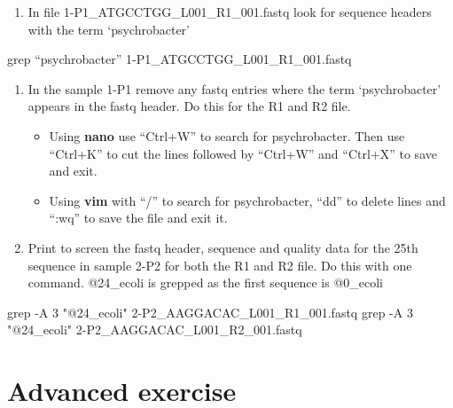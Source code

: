 \documentclass[
  letterpaper,
  DIV=11,
  numbers=noendperiod]{scrreprt}
\newenvironment{Shaded}{\begin{snugshade}}{\end{snugshade}}
\newcommand{\AttributeTok}[1]{\textcolor[rgb]{0.40,0.45,0.13}{#1}}
\newcommand{\FunctionTok}[1]{\textcolor[rgb]{0.28,0.35,0.67}{#1}}
\newcommand{\NormalTok}[1]{\textcolor[rgb]{0.00,0.23,0.31}{#1}}
\newcommand{\StringTok}[1]{\textcolor[rgb]{0.13,0.47,0.30}{#1}}
\providecommand{\tightlist}{%
  \setlength{\itemsep}{0pt}\setlength{\parskip}{0pt}}
\begin{document}
\begin{enumerate}
\def\labelenumi{\arabic{enumi}.}
\setcounter{enumi}{8}
\tightlist
\item
  In file 1-P1\_ATGCCTGG\_L001\_R1\_001.fastq look for sequence headers
  with the term `psychrobacter'
\end{enumerate}

\begin{Shaded}
\begin{Highlighting}[]
\FunctionTok{grep}\NormalTok{ “psychrobacter” 1{-}P1\_ATGCCTGG\_L001\_R1\_001.fastq}
\end{Highlighting}
\end{Shaded}

\begin{enumerate}
\def\labelenumi{\arabic{enumi}.}
\setcounter{enumi}{9}
\tightlist
\item
  In the sample 1-P1 remove any fastq entries where the term
  `psychrobacter' appears in the fastq header. Do this for the R1 and R2
  file.

  \begin{itemize}
  \tightlist
  \item
    Using \textbf{nano} use ``Ctrl+W'' to search for psychrobacter. Then
    use ``Ctrl+K'' to cut the lines followed by ``Ctrl+W'' and
    ``Ctrl+X'' to save and exit.
  \item
    Using \textbf{vim} with ``/'' to search for psychrobacter, ``dd'' to
    delete lines and ``:wq'' to save the file and exit it.
  \end{itemize}
\item
  Print to screen the fastq header, sequence and quality data for the
  25th sequence in sample 2-P2 for both the R1 and R2 file. Do this with
  one command. @24\_ecoli is grepped as the first sequence is @0\_ecoli
\end{enumerate}

\begin{Shaded}
\begin{Highlighting}[]
\FunctionTok{grep} \AttributeTok{{-}A}\NormalTok{ 3 }\StringTok{"@24\_ecoli"}\NormalTok{ 2{-}P2\_AAGGACAC\_L001\_R1\_001.fastq}
\FunctionTok{grep} \AttributeTok{{-}A}\NormalTok{ 3 }\StringTok{"@24\_ecoli"}\NormalTok{ 2{-}P2\_AAGGACAC\_L001\_R2\_001.fastq}
\end{Highlighting}
\end{Shaded}

\chapter*{Advanced exercise}\label{exerciseadv_answers}
\end{document}
